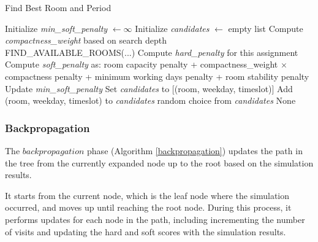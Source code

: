 \begin{algorithm}
\caption{Find Best Room and Period}\label{find_best_room_and_period}
\begin{algorithmic}[1]
    \State Initialize \textit{min\_soft\_penalty} $\gets \infty$
    \State Initialize \textit{candidates} $\gets$ empty list
    \State Compute \textit{compactness\_weight} based on search depth
\\
        \State FIND\_AVAILABLE\_ROOMS(...)
            \State Compute \textit{hard\_penalty} for this assignment
                \State Compute \textit{soft\_penalty} as:
                \State \hspace{0.5cm} room capacity penalty
                \State \hspace{0.5cm} + compactness\_weight $\times$ compactness penalty
                \State \hspace{0.5cm} + minimum working days penalty
                \State \hspace{0.5cm} + room stability penalty
                    \State Update \textit{min\_soft\_penalty}
                    \State Set \textit{candidates} to [(room, weekday, timeslot)]
                    \State Add (room, weekday, timeslot) to \textit{candidates}
                \EndIf
            \EndIf
        \EndFor
    \EndFor
        \State \Return random choice from \textit{candidates}
    \Else
        \State \Return None
    \EndIf
\EndFunction
\end{algorithmic}
\end{algorithm}


\subsubsection{Backpropagation}

The \(backpropagation\) phase (Algorithm \ref{backpropagation}) updates the path in the tree from the currently expanded node up to the root based on the simulation results. 

It starts from the current node, which is the leaf node where the simulation occurred, and moves up until reaching the root node. During this process, it performs updates for each node in the path, including incrementing the number of visits and updating the hard and soft scores with the simulation results. 

